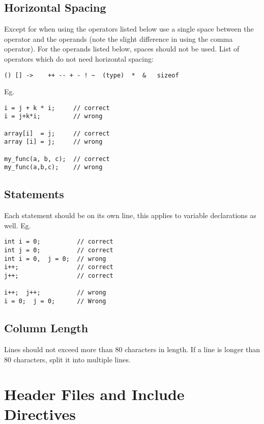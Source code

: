 \subsection{Horizontal Spacing}

Except for when using the operators listed below use a single space
between the operator and the operands (note the slight difference in
using the comma operator).  For the operands listed below, spaces
should not be used.  List of operators which do not need horizontal
spacing:

\begin{Verbatim}
() [] ->    ++ -- + - ! ~  (type)  *  &   sizeof
\end{Verbatim}

Eg.

\begin{Verbatim}
i = j + k * i;     // correct 
i = j+k*i;         // wrong

array[i]  = j;     // correct 
array [i] = j;     // wrong

my_func(a, b, c);  // correct 
my_func(a,b,c);    // wrong
\end{Verbatim}



\subsection{Statements}

Each statement should be on its own line, this applies to variable
declarations as well. Eg.

\begin{Verbatim}
int i = 0;          // correct 
int j = 0;          // correct
int i = 0,  j = 0;  // wrong 
i++;                // correct
j++;                // correct

i++;  j++;          // wrong 
i = 0;  j = 0;      // Wrong
\end{Verbatim}



\subsection{Column Length}

Lines should not exceed more than 80 characters in length.  If a line
is longer than 80 characters, split it into multiple lines.


\section{Header Files and Include Directives}

